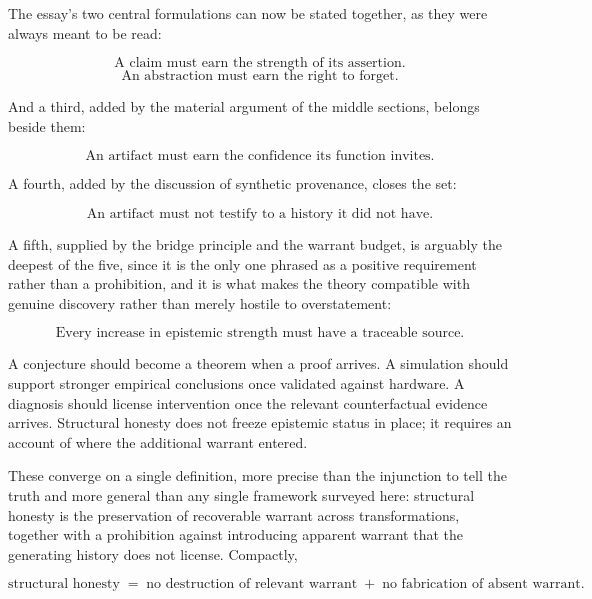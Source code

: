 \documentclass[11pt]{article}
\begin{document}
The essay's two central formulations can now be stated together, as they were always meant to be read:

\[
\boxed{\text{A claim must earn the strength of its assertion.}}
\]
\[
\boxed{\text{An abstraction must earn the right to forget.}}
\]

And a third, added by the material argument of the middle sections, belongs beside them:

\[
\boxed{\text{An artifact must earn the confidence its function invites.}}
\]

A fourth, added by the discussion of synthetic provenance, closes the set:

\[
\boxed{\text{An artifact must not testify to a history it did not have.}}
\]

A fifth, supplied by the bridge principle and the warrant budget, is arguably the deepest of the five, since it is the only one phrased as a positive requirement rather than a prohibition, and it is what makes the theory compatible with genuine discovery rather than merely hostile to overstatement:

\[
\boxed{\text{Every increase in epistemic strength must have a traceable source.}}
\]

A conjecture should become a theorem when a proof arrives. A simulation should support stronger empirical conclusions once validated against hardware. A diagnosis should license intervention once the relevant counterfactual evidence arrives. Structural honesty does not freeze epistemic status in place; it requires an account of where the additional warrant entered.

These converge on a single definition, more precise than the injunction to tell the truth and more general than any single framework surveyed here: structural honesty is the preservation of recoverable warrant across transformations, together with a prohibition against introducing apparent warrant that the generating history does not license. Compactly,

\[
\boxed{\text{structural honesty} \;=\; \text{no destruction of relevant warrant} \;+\; \text{no fabrication of absent warrant}.}
\]
\end{document}
